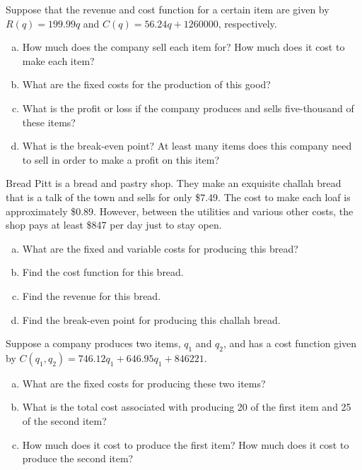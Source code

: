 \documentclass[11pt,letterpaper]{article}
\begin{document}

 Suppose that the revenue and cost function for a certain item are given by $R(q)= 199.99q$ and $C(q)= 56.24q + 1260000$, respectively. 
	\begin{enumerate}[(a)]
	\item How much does the company sell each item for? How much does it cost to make each item?
	\item What are the fixed costs for the production of this good?
	\item What is the profit or loss if the company produces and sells five-thousand of these items?
	\item What is the break-even point? At least many items does this company need to sell in order to make a profit on this item?
	\end{enumerate}



\newpage



 Bread Pitt is a bread and pastry shop. They make an exquisite challah bread that is a talk of the town and sells for only \$7.49. The cost to make each loaf is approximately \$0.89. However, between the utilities and various other costs, the shop pays at least \$847 per day just to stay open. 
	\begin{enumerate}[(a)]
	\item What are the fixed and variable costs for producing this bread?
	\item Find the cost function for this bread.
	\item Find the revenue for this bread.
	\item Find the break-even point for producing this challah bread. 
	\end{enumerate}



\newpage



 Suppose a company produces two items, $q_1$ and $q_2$, and has a cost function given by $C(q_1, q_2)= 746.12q_1 + 646.95q_1 + 846221$. 
	\begin{enumerate}[(a)]
	\item What are the fixed costs for producing these two items?
	\item What is the total cost associated with producing 20 of the first item and 25 of the second item?
	\item How much does it cost to produce the first item? How much does it cost to produce the second item?
	\end{enumerate}
\end{document}

